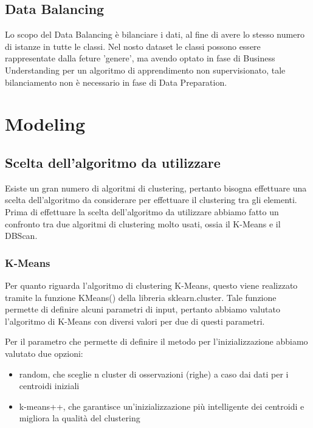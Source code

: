 \documentclass[a4paper, 10pt]{report}
\begin{document}
        \section{Data Balancing}\label{sec:data-balancing}
            Lo scopo del Data Balancing è bilanciare i dati, al fine di avere lo stesso numero di istanze in tutte le classi.
            Nel nosto dataset le classi possono essere rappresentate dalla feture 'genere', ma avendo optato in fase di
            Business Understanding per un algoritmo di apprendimento non supervisionato, tale bilanciamento non è necessario
            in fase di Data Preparation.


    \chapter{Modeling}\label{ch:modeling}


        \section{Scelta dell'algoritmo da utilizzare}\label{sec:scelta-dell'algoritmo-da-utilizzare}
            Esiste un gran numero di algoritmi di clustering, pertanto bisogna effettuare una scelta dell'algoritmo da considerare
            per effettuare il clustering tra gli elementi.
            Prima di effettuare la scelta dell'algoritmo da utilizzare abbiamo fatto un confronto tra due algoritmi di clustering molto
            usati, ossia il K-Means e il DBScan.

            \subsection{K-Means}
            Per quanto riguarda l'algoritmo di clustering K-Means, questo viene realizzato tramite la funzione KMeans()
            della libreria sklearn.cluster.
            Tale funzione permette di definire alcuni parametri di input, pertanto abbiamo valutato l'algoritmo di K-Means
            con diversi valori per due di questi parametri.

            Per il parametro che permette di definire il metodo per l'inizializzazione abbiamo valutato due opzioni:
                \begin{itemize}
                    \item random, che sceglie n cluster di osservazioni (righe) a caso dai dati per i centroidi iniziali
                    \item k-means++, che garantisce un'inizializzazione più intelligente dei centroidi e migliora la qualità del clustering
                \end{itemize}
\end{document}
